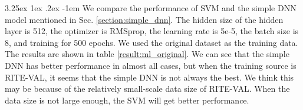 \documentclass[12pt]{article}
\makeatletter
\renewcommand\paragraph{\@startsection{paragraph}{5}{\z@}%
  {3.25ex \@plus1ex \@minus.2ex}%
  {-1em}%
  {\normalfont\normalsize\bfseries}}
\makeatother
\begin{document}
\begin{CJK*}{UTF8}{bkai}
\begin{spacing}{1.77}
\paragraph{}
We compare the performance of SVM and the simple DNN model mentioned in Sec. \ref{section:simple_dnn}. The hidden size of the hidden layer is 512, the optimizer is RMSprop, the learning rate is 5e-5, the batch size is 8, and training for 500 epochs. We used the original dataset as the training data. The results are shown in table \ref{result:ml_original}. We can see that the simple DNN has better performance in almost all cases, but when the training source is RITE-VAL, it seems that the simple DNN is not always the best. We think this may be because of the relatively small-scale data size of RITE-VAL. When the data size is not large enough, the SVM will get better performance.


\end{spacing}
\end{CJK*}
\end{document}
